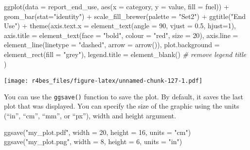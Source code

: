 \documentclass[
]{book}
\newenvironment{Shaded}{\begin{snugshade}}{\end{snugshade}}
\newcommand{\AttributeTok}[1]{\textcolor[rgb]{0.77,0.63,0.00}{#1}}
\newcommand{\CommentTok}[1]{\textcolor[rgb]{0.56,0.35,0.01}{\textit{#1}}}
\newcommand{\DecValTok}[1]{\textcolor[rgb]{0.00,0.00,0.81}{#1}}
\newcommand{\FloatTok}[1]{\textcolor[rgb]{0.00,0.00,0.81}{#1}}
\newcommand{\FunctionTok}[1]{\textcolor[rgb]{0.00,0.00,0.00}{#1}}
\newcommand{\NormalTok}[1]{#1}
\newcommand{\SpecialCharTok}[1]{\textcolor[rgb]{0.00,0.00,0.00}{#1}}
\newcommand{\StringTok}[1]{\textcolor[rgb]{0.31,0.60,0.02}{#1}}
\begin{document}
\begin{Shaded}
\begin{Highlighting}[]
\FunctionTok{ggplot}\NormalTok{(}\AttributeTok{data =}\NormalTok{ report\_end\_use, }\FunctionTok{aes}\NormalTok{(}\AttributeTok{x =}\NormalTok{ category, }\AttributeTok{y =}\NormalTok{ value, }\AttributeTok{fill =}\NormalTok{ fuel)) }\SpecialCharTok{+}
    \FunctionTok{geom\_bar}\NormalTok{(}\AttributeTok{stat=}\StringTok{"identity"}\NormalTok{) }\SpecialCharTok{+} 
    \FunctionTok{scale\_fill\_brewer}\NormalTok{(}\AttributeTok{palette =} \StringTok{"Set2"}\NormalTok{) }\SpecialCharTok{+}
    \FunctionTok{ggtitle}\NormalTok{(}\StringTok{"End Use"}\NormalTok{) }\SpecialCharTok{+}
    \FunctionTok{theme}\NormalTok{(}\AttributeTok{axis.text.x =} \FunctionTok{element\_text}\NormalTok{(}\AttributeTok{angle =} \DecValTok{90}\NormalTok{, }\AttributeTok{vjust =} \FloatTok{0.5}\NormalTok{, }\AttributeTok{hjust=}\DecValTok{1}\NormalTok{),}
          \AttributeTok{axis.title =} \FunctionTok{element\_text}\NormalTok{(}\AttributeTok{face =} \StringTok{"bold"}\NormalTok{, }
                                    \AttributeTok{colour =} \StringTok{"red"}\NormalTok{,}
                                    \AttributeTok{size =} \DecValTok{20}\NormalTok{),}
          \AttributeTok{axis.line =} \FunctionTok{element\_line}\NormalTok{(}\AttributeTok{linetype =} \StringTok{"dashed"}\NormalTok{, }
                                   \AttributeTok{arrow =} \FunctionTok{arrow}\NormalTok{()),}
          \AttributeTok{plot.background =} \FunctionTok{element\_rect}\NormalTok{(}\AttributeTok{fill =} \StringTok{"grey"}\NormalTok{),}
          \AttributeTok{legend.title =} \FunctionTok{element\_blank}\NormalTok{() }\CommentTok{\# remove legend title}
\NormalTok{          )}
\end{Highlighting}
\end{Shaded}

\texttt{[image: r4bes\_files/figure-latex/unnamed-chunk-127-1.pdf]}

You can use the \texttt{ggsave()} function to save the plot. By default, it saves the last plot that was displayed. You can specify the size of the graphic using the units (``in'', ``cm'', ``mm'', or ``px''), width and height argument.

\begin{Shaded}
\begin{Highlighting}[]
\FunctionTok{ggsave}\NormalTok{(}\StringTok{"my\_plot.pdf"}\NormalTok{, }\AttributeTok{width =} \DecValTok{20}\NormalTok{, }\AttributeTok{height =} \DecValTok{16}\NormalTok{, }\AttributeTok{units =} \StringTok{"cm"}\NormalTok{)}
\FunctionTok{ggsave}\NormalTok{(}\StringTok{"my\_plot.png"}\NormalTok{, }\AttributeTok{width =} \DecValTok{8}\NormalTok{, }\AttributeTok{height =} \DecValTok{6}\NormalTok{, }\AttributeTok{units =} \StringTok{"in"}\NormalTok{)}
\end{Highlighting}
\end{Shaded}
\end{document}
